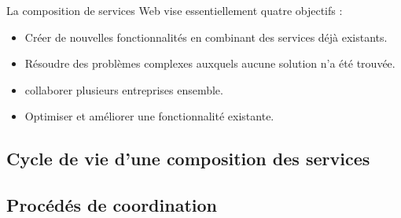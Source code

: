 
    

    La composition de services Web vise essentiellement quatre
    objectifs \cite{driss2011approche}:
    \begin{itemize}

      \item Créer de nouvelles fonctionnalités en combinant des services
        déjà existants.

      \item Résoudre des problèmes complexes auxquels aucune solution
        n'a été trouvée.

      \item collaborer plusieurs entreprises ensemble.

      \item Optimiser et améliorer une fonctionnalité existante.
    \end{itemize}

    \subsection{Cycle de vie d'une composition des services}
    \label{sec:cycle-de-vie}
    
    \newpage

    \subsection{Procédés de coordination}
    \label{sec:proc-de-coord}
    

